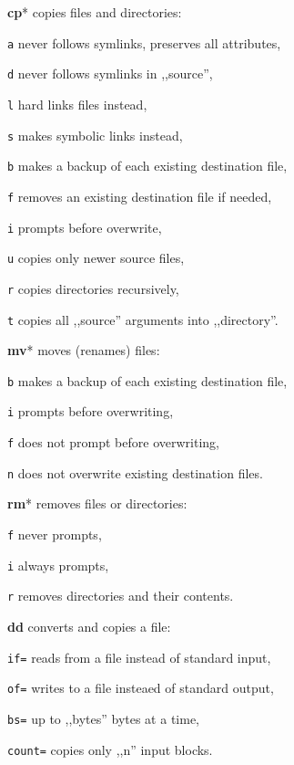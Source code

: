 
\begin{enumx}
	\item [\cmd] \textbf{cp}* copies files and directories:
	\item [\texttt{a}] never follows symlinks, preserves all attributes,
	\item [\texttt{d}] never follows symlinks in ,,source'',
	\item [\texttt{l}] hard links files instead,
	\item [\texttt{s}] makes symbolic links instead,
	\item [\texttt{b}] makes a backup of each existing destination file,
	\item [\texttt{f}] removes an existing destination file if needed,
	\item [\texttt{i}] prompts before overwrite,
	\item [\texttt{u}] copies only newer source files,
	\item [\texttt{r}] copies directories recursively,
	\item [\texttt{t}] copies all ,,source'' arguments into ,,directory''.
	
	\item [\cmd] \textbf{mv}* moves (renames) files:
	\item [\texttt{b}] makes a backup of each existing destination file,
	\item [\texttt{i}] prompts before overwriting,
	\item [\texttt{f}] does not prompt before overwriting,
	\item [\texttt{n}] does not overwrite existing destination files.
	
	\item [\cmd] \textbf{rm}* removes files or directories:
	\item [\texttt{f}] never prompts,
	\item [\texttt{i}] always prompts,
	\item [\texttt{r}] removes directories and their contents.
\end{enumx}

\begin{enumx}
	\item [\cmd] \textbf{dd} converts and copies a file:
	\item [\texttt{if=}] reads from a file instead of standard input,
	\item [\texttt{of=}] writes to a file insteaed of standard output,
	\item [\texttt{bs=}] up to ,,bytes'' bytes at a time,
	\item [\texttt{count=}] copies only ,,n'' input blocks.
\end{enumx}

